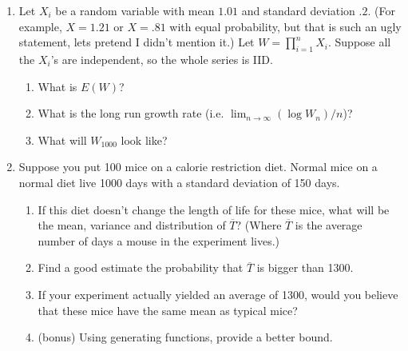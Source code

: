 \documentclass[letter,12pt]{extarticle}
\newcommand{\gap}{\vspace{1em}}
\newcommand{\answer}[1]{\noindent{\textcolor{mypurple}{\scriptsize{\{\bf answer:} \em #1\}}}}
\renewcommand{\answer}[1]{}
\begin{document}
\begin{enumerate}
\item Let $X_i$ be a random variable with mean $1.01$ and standard
deviation $.2$.  (For example, $X = 1.21$ or $X = .81$ with equal
probability, but that is such an ugly statement, lets pretend I didn't
mention it.)  Let $W = \prod_{i=1}^n X_i$.  Suppose all the $X_i$'s
are independent, so the whole series is IID.
\begin{enumerate}
\item What is $E(W)$?\answer{$E(W) = 1.01^n$}
\item What is the long run growth rate (i.e. $\lim_{n \to \infty}
(\log W_n)/n$)?\answer{$\log W_n)/n \approx E(\log(X)) \approx E(X-1) - V(X)/2
= .01 - .2^2/2 = -.01$}
\item What will $W_{1000}$ look like?\answer{$.99^{1000}=e^{-.01*1000}
= e^{-10} \approx .0001$}
\end{enumerate}
\gap

\item Suppose you put 100 mice on a calorie restriction diet.
Normal mice on a normal diet live 1000 days with a standard deviation
of 150 days.   
\begin{enumerate}
\item If this diet doesn't change the length of life for these mice,
what will be the mean, variance and distribution of $\overline{T}$?
(Where $\overline{T}$ is the average number of days a mouse in the
experiment lives.)\answer{$E(\overline{T}) = 1000$, $V(\overline{T}) =
(15)^2$, it is normal.}
\item Find a good estimate the probability that $\overline{T}$ is
bigger than 1300.\answer{$(\overline{T}-1000)/15 = 20$.  So via
Chebeshev, the probability is less than $1/20^2$, or 1/400.}
\item If your experiment actually yielded an average of 1300, would
you believe that these mice have the same mean as typical
mice?\answer{Nope!  Low feed mice live longer.}
\item (bonus) Using generating functions, provide a better
bound.\answer{If you have a really big table for normals, it might go
out to twenty, and so you know the answer is about 1/googol. (I
mentioned this fact in class--but this is just an asside.)  Here are
your steps: (1) compute the moment generating function to be $g(t) =
e^{t^2/2}$. (2) Now use Markov for $P(e^{tZ} > e^{t20}) <
e^{t^2/2}/e^{t 20}$. (3) Now optimize this over $t$ to see that $t=20$
gets the best bound. (4) the bound is now $e^{-200}$.}
\end{enumerate}

\end{enumerate}
\end{document}
